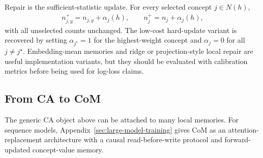 Repair is the sufficient-statistic update. For every selected concept $j\in N(h)$,
\begin{align*}
n_{j,y}^+=n_{j,y}+\alpha_j(h),
\qquad
n_j^+=n_j+\alpha_j(h),
\end{align*}
with all unselected counts unchanged. The low-cost hard-update variant is recovered by setting $\alpha_{j^\star}=1$ for the highest-weight concept and $\alpha_j=0$ for all $j\ne j^\star$. Embedding-mean memories and ridge or projection-style local repair are useful implementation variants, but they should be evaluated with calibration metrics before being used for log-loss claims.

\subsection{From CA to CoM}
\label{sec:language-dgm}

The generic CA object above can be attached to many local memories. For sequence models, Appendix~\ref{sec:large-model-training} gives CoM as an attention-replacement architecture with a causal read-before-write protocol and forward-updated concept-value memory.

